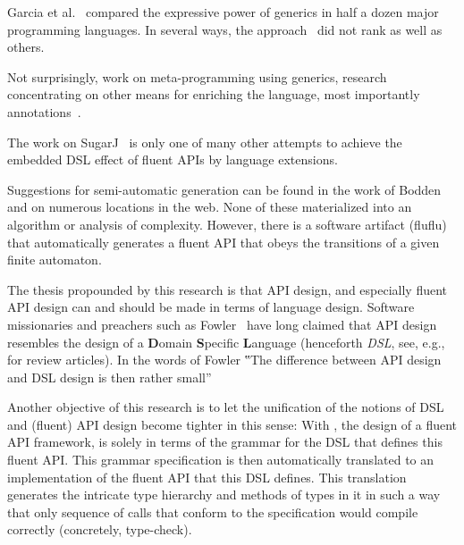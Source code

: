 Garcia et al.~\cite{Garcia:Jarvi:Lumsdaine:Siek:Willcock:03} compared the
expressive power of generics in half a dozen major programming languages. In
several ways, the \Java approach~\cite{Bracha:Odersky:Stoutamire:Wadler:98} did
not rank as well as others.

Not surprisingly, work on meta-programming using \Java generics, research
concentrating on other means for enriching the language, most importantly
annotations~\cite{Papi:08}.

The work on SugarJ~\cite{Erdweg:2011} is only one of many other attempts to
achieve the embedded DSL effect of fluent APIs by language extensions.

Suggestions for semi-automatic generation can be found in the work of
Bodden~\cite{Bodden:14} and on numerous locations in the web. None of these
materialized into an algorithm or analysis of complexity. However, there is a
software artifact (fluflu) that
automatically generates a fluent API that obeys the transitions of a given
finite automaton.

The thesis propounded by this research is that API design, and especially
fluent API design
can and should be made in terms of language design. Software missionaries
and preachers such as Fowler~\cite{Fowler:2005} have long claimed that API
design resembles the design of a \textbf Domain \textbf Specific \textbf
Language (henceforth \emph{DSL}, see,
e.g.,~\cite{VanDeursen:Klint:2000,Hudak:1997,Fowler:2010} for review
articles).
In the words of Fowler ‟The difference between API design and DSL design is
then rather small”~\cite{Fowler:2005}

Another objective of this research is to let the unification of the notions of
DSL and (fluent) API design become tighter in this sense: With \Self, the
design of a fluent API framework, is solely in terms of the grammar for the DSL
that defines this fluent API\@. This grammar specification is then
automatically translated to an implementation of the fluent API that this DSL
defines. This translation generates the intricate type hierarchy
and methods of types in it in such a way
that only sequence of calls that conform
to the specification would
compile correctly (concretely, type-check).
